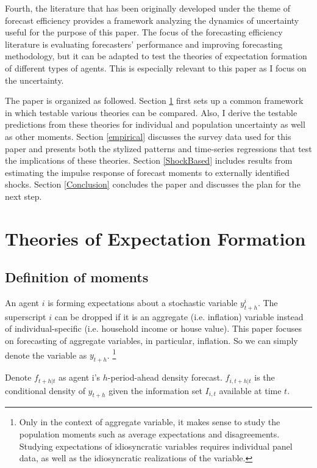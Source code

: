 \documentclass[12pt]{article}
\begin{document}
	Fourth, the literature that has been originally developed under the theme of forecast efficiency provides a framework analyzing the dynamics of uncertainty useful for the purpose of this paper. The focus of the forecasting efficiency literature is evaluating forecasters' performance and improving forecasting methodology, but it can be adapted to test the theories of expectation formation of different types of agents. This is especially relevant to this paper as I focus on the uncertainty. 
	
	The paper is organized as followed. Section \ref{theory} first sets up a common framework in which testable various theories can be compared. Also, I derive the testable predictions from these theories for individual and population uncertainty as well as other moments. Section \ref{empirical} discusses the survey data used for this paper and presents both the stylized patterns and time-series regressions that test the implications of these theories.   Section \ref{ShockBased} includes results from estimating the impulse response of forecast moments to externally identified shocks.  Section \ref{Conclusion} concludes the paper and discusses the plan for the next step. 
	
	
	\section{Theories of Expectation Formation}\label{theory}
	
	\subsection{Definition of moments}
	
	An agent $i$ is forming expectations about a stochastic variable $y^i_{t+h}$. The superscript $i$ can be dropped if it is an aggregate (i.e. inflation) variable instead of individual-specific  (i.e. household income or house value). This paper focuses on forecasting of aggregate variables, in particular, inflation. So we can simply denote the variable as $y_{t+h}$.  \footnote{Only in the context of aggregate variable, it makes sense to study the population moments such as average expectations and disagreements. Studying expectations of idiosyncratic variables requires individual panel data, as well as the idiosyncratic realizations of the variable. }
	
	Denote $ f_{t+h|t}$ as agent i's $h$-period-ahead density forecast. $ f_{i,t+h|t}$ is the conditional density of $y_{t+h}$ given the information set $I_{i,t}$ available at time $t$. 
	
\end{document}
